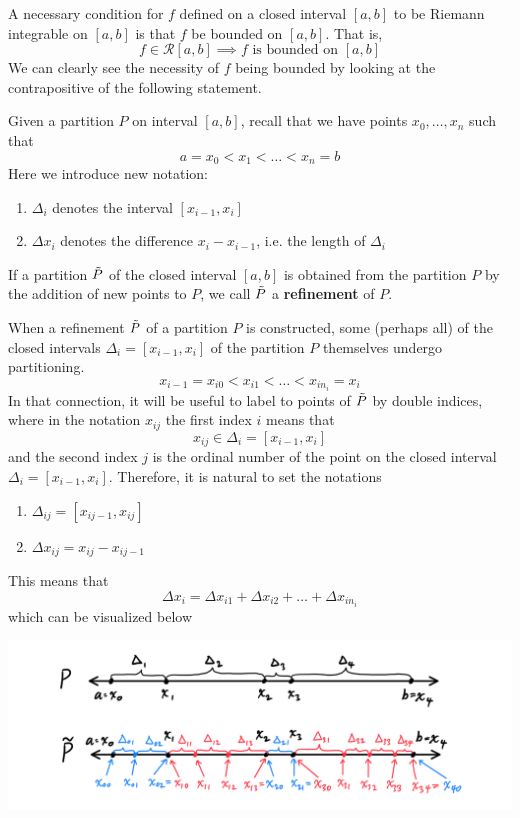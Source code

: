     \begin{theorem}
    A necessary condition for $f$ defined on a closed interval $[a, b]$ to be Riemann integrable on $[a, b]$ is that $f$ be bounded on $[a, b]$. That is, 
    \[f \in \mathcal{R}[a, b] \implies f \text{ is bounded on } [a, b]\]
    We can clearly see the necessity of $f$ being bounded by looking at the contrapositive of the following statement. 
    \end{theorem}

    \begin{theorem}[Refinement]
    Given a partition $P$ on interval $[a, b]$, recall that we have points $x_0, \ldots, x_n$ such that
    \[a = x_0 < x_1 < \ldots < x_n = b\]
    Here we introduce new notation: 
    \begin{enumerate}
      \item $\Delta_i$ denotes the interval $[x_{i-1}, x_i]$
      \item $\Delta x_i$ denotes the difference $x_i - x_{i-1}$, i.e. the length of $\Delta_i$
    \end{enumerate}
    If a partition $\Tilde{P}$ of the closed interval $[a, b]$ is obtained from the partition $P$ by the addition of new points to $P$, we call $\Tilde{P}$ a \textbf{refinement} of $P$. 

    When a refinement $\Tilde{P}$ of a partition $P$ is constructed, some (perhaps all) of the closed intervals $\Delta_i = [x_{i-1}, x_i]$ of the partition $P$ themselves undergo partitioning. 
    \[x_{i-1} = x_{i0} < x_{i1} < \ldots < x_{in_i} = x_i\]
    In that connection, it will be useful to label to points of $\Tilde{P}$ by double indices, where in the notation $x_{ij}$ the first index $i$ means that 
    \[x_{ij} \in \Delta_i = [x_{i-1}, x_i]\]
    and the second index $j$ is the ordinal number of the point on the closed interval $\Delta_i = [x_{i-1}, x_i]$. Therefore, it is natural to set the notations
    \begin{enumerate}
      \item $\Delta_{ij} = [x_{i j-1}, x_{ij}]$
      \item $\Delta x_{ij} = x_{ij} - x_{ij-1}$
    \end{enumerate}
    This means that 
    \[\Delta x_i = \Delta x_{i1} + \Delta x_{i2} + \ldots + \Delta x_{in_i}\]
    which can be visualized below
    \begin{center}
      \includegraphics[scale=0.25]{img/Refinement_Definition_Analysis.PNG}
    \end{center}
    \end{theorem}

